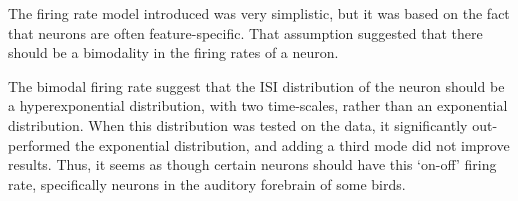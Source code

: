The firing rate model introduced was very simplistic, but it was based on the fact that neurons are often feature-specific.  That assumption suggested that there should be a bimodality in the firing rates of a neuron.

The bimodal firing rate suggest that the ISI distribution of the neuron should be a hyperexponential distribution, with two time-scales, rather than an exponential distribution.  When this distribution was tested on the data, it significantly out-performed the exponential distribution, and adding a third mode did not improve results.  Thus, it seems as though certain neurons should have this \lq{}on-off\rq{} firing rate, specifically neurons in the auditory forebrain of some birds.

